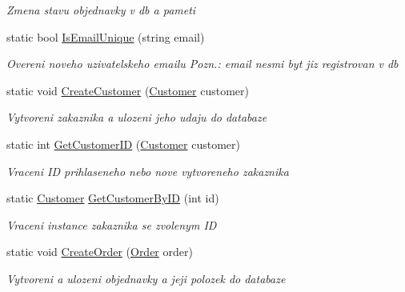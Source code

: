 \begin{DoxyCompactItemize}
\begin{DoxyCompactList}\small\item\em Zmena stavu objednavky v db a pameti \end{DoxyCompactList}\item 
static bool \mbox{\hyperlink{class_eshop_1_1_database_abbe61af76e675e7dcc8c3e5bb4654b5a}{Is\+Email\+Unique}} (string email)
\begin{DoxyCompactList}\small\item\em Overeni noveho uzivatelskeho emailu Pozn.\+: email nesmi byt jiz registrovan v db \end{DoxyCompactList}\item 
static void \mbox{\hyperlink{class_eshop_1_1_database_ad1ca42e5306e3151dbe0e3be03d89eec}{Create\+Customer}} (\mbox{\hyperlink{class_eshop_1_1_customer}{Customer}} customer)
\begin{DoxyCompactList}\small\item\em Vytvoreni zakaznika a ulozeni jeho udaju do databaze \end{DoxyCompactList}\item 
static int \mbox{\hyperlink{class_eshop_1_1_database_a4f6bab0fe88f9bd59f31acddd5aaa0e9}{Get\+Customer\+ID}} (\mbox{\hyperlink{class_eshop_1_1_customer}{Customer}} customer)
\begin{DoxyCompactList}\small\item\em Vraceni ID prihlaseneho nebo nove vytvoreneho zakaznika \end{DoxyCompactList}\item 
static \mbox{\hyperlink{class_eshop_1_1_customer}{Customer}} \mbox{\hyperlink{class_eshop_1_1_database_ae53edd2dd11678fc40a4594574ebf353}{Get\+Customer\+By\+ID}} (int id)
\begin{DoxyCompactList}\small\item\em Vraceni instance zakaznika se zvolenym ID \end{DoxyCompactList}\item 
static void \mbox{\hyperlink{class_eshop_1_1_database_a4faa9a3bc15b629843563b35f8c2ea89}{Create\+Order}} (\mbox{\hyperlink{class_eshop_1_1_order}{Order}} order)
\begin{DoxyCompactList}\small\item\em Vytvoreni a ulozeni objednavky a jeji polozek do databaze \end{DoxyCompactList}\end{DoxyCompactItemize}
